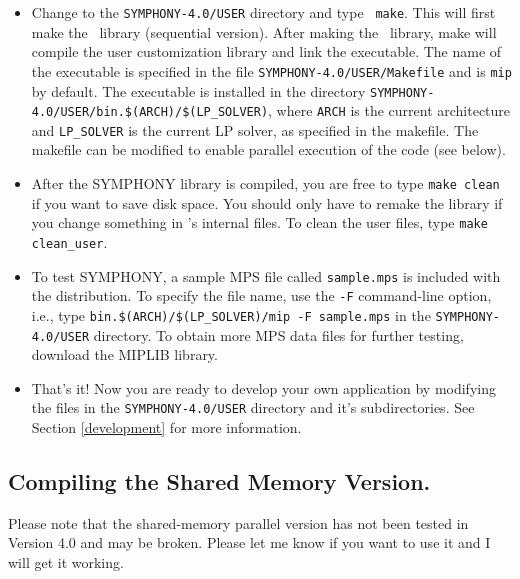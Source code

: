 \begin{itemize}
        \item Change to the \texttt{SYMPHONY-4.0/USER} directory and type
\texttt{ make}. This will first make the
\BB\ library (sequential version). After making the \BB\ library, make will
compile the user customization library and link the executable. The name of
the executable is specified in the file \texttt{SYMPHONY-4.0/USER/Makefile}
and is \texttt{mip} by default. The executable is installed in the directory
\texttt{SYMPHONY-4.0/USER/bin.\$(ARCH)/\$(LP\_SOLVER)}, where \texttt{ARCH} is 
the current architecture and \texttt{LP\_SOLVER} is the current LP solver, as 
specified in the makefile. The makefile can be modified to enable parallel 
execution of the code (see below).

\item After the SYMPHONY library is compiled, you are free to type {\tt make
        clean} if you want to save disk space. You should only have to
        remake the library if you change something in \BB's internal files. To
        clean the user files, type {\tt make clean\_user}.

\item To test SYMPHONY, a sample MPS file called \texttt{sample.mps} is included 
with the distribution. To specify the file name, use the \texttt{-F} command-line
option, i.e., type \texttt{bin.\$(ARCH)/\$(LP\_SOLVER)/mip -F sample.mps} in the
\texttt{SYMPHONY-4.0/USER} directory. To obtain more MPS data files for further
testing, download the MIPLIB library.

\item That's it! Now you are ready to develop your own application by modifying
the files in the \texttt{SYMPHONY-4.0/USER} directory and it's
subdirectories. See Section \ref{development} for more information.

\end{itemize}

\subsection{Compiling the Shared Memory Version.}

Please note that the shared-memory parallel version has not been tested in
Version 4.0 and may be broken. Please let me know if you want to use it and I
will get it working. 

